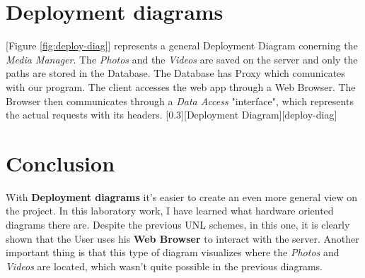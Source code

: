 \documentclass{article}
\begin{document}
	\section{Deployment diagrams}
		[Figure \ref{fig:deploy-diag}] represents a general Deployment Diagram conerning the \textit{Media Manager}. The \textit{Photos} and the \textit{Videos} are saved on the server and only the paths are stored in the Database. The Database has Proxy which comunicates with our program. The client accesses the web app through a Web Browser. The Browser then communicates through a \textit{Data Access} "interface", which represents the actual requests with its headers.
		[0.3][Deployment Diagram][deploy-diag]

	\section{Conclusion}
		With \textbf{Deployment diagrams} it's easier to create an even more general view on the project. In this laboratory work, I have learned what hardware oriented diagrams there are. Despite the previous UNL schemes, in this one, it is clearly shown that the User uses his \textbf{Web Browser} to interact with the server. Another important thing is that this type of diagram visualizes where the \textit{Photos} and \textit{Videos} are located, which wasn't quite possible in the previous diagrams.
\end{document}
